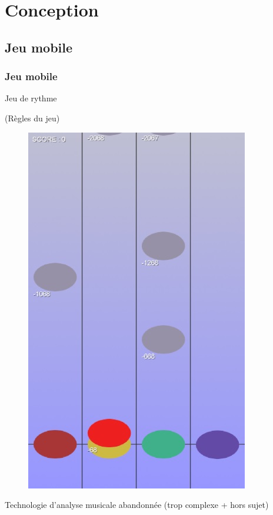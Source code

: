 \section{Conception}

\subsection{Jeu mobile}
\begin{frame}
\frametitle{Jeu mobile}
\begin{center}
Jeu de rythme

(Règles du jeu)
\begin{figure}
\includegraphics[scale=0.2]{images/jeu3.jpg}
\end{figure}
\end{center}
\end{frame}

\begin{frame}
\begin{center}
Technologie d'analyse musicale abandonnée (trop complexe + hors sujet)
\end{center}
\end{frame}


